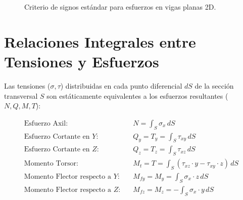 \begin{figure}[H]
    \centering
    \caption{Criterio de signos estándar para esfuerzos en vigas planas 2D.}
    \label{fig:criterio_signos_esfuerzos}
\end{figure}

\section{Relaciones Integrales entre Tensiones y Esfuerzos}

Las tensiones ($\sigma, \tau$) distribuidas en cada punto diferencial $dS$ de la sección transversal $S$ son estáticamente equivalentes a los esfuerzos resultantes ($N, Q, M, T$):

\begin{align}
    \text{Esfuerzo Axil:}                  & \quad N = \int_S \sigma_x \, dS \label{eq:int_axil}                                      \\[6pt]
    \text{Esfuerzo Cortante en $Y$:}       & \quad Q_y = T_y = \int_S \tau_{xy} \, dS \label{eq:int_qy}                               \\[6pt]
    \text{Esfuerzo Cortante en $Z$:}       & \quad Q_z = T_z = \int_S \tau_{xz} \, dS \label{eq:int_qz}                               \\[6pt]
    \text{Momento Torsor:}                 & \quad M_t = T = \int_S (\tau_{xz}\cdot y - \tau_{xy}\cdot z) \, dS \label{eq:int_torsor} \\[6pt]
    \text{Momento Flector respecto a $Y$:} & \quad M_{fy} = M_y = \int_S \sigma_x \cdot z \, dS \label{eq:int_my}                     \\[6pt]
    \text{Momento Flector respecto a $Z$:} & \quad M_{fz} = M_z = -\int_S \sigma_x \cdot y \, dS \label{eq:int_mz}
\end{align}

